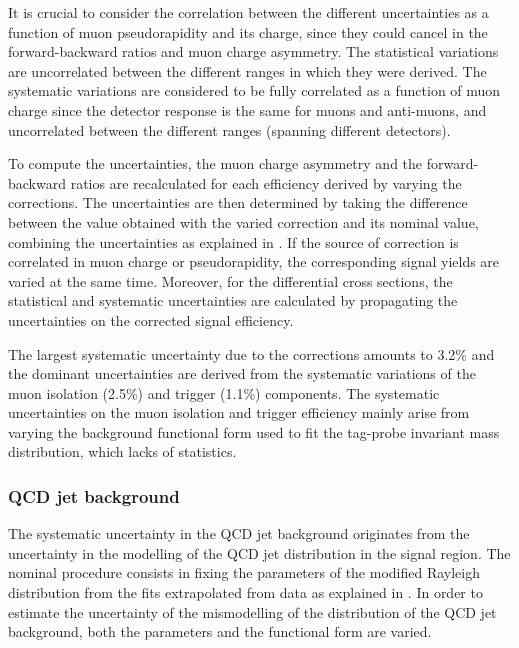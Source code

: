 It is crucial to consider the correlation between the different \tnp uncertainties as a function of muon pseudorapidity and its charge, since they could cancel in the forward-backward ratios and muon charge asymmetry. The statistical \tnp variations are uncorrelated between the different \etaLAB ranges in which they were derived. The systematic \tnp variations are considered to be fully correlated as a function of muon charge since the detector response is the same for muons and anti-muons, and uncorrelated between the different \etaCM ranges (spanning different detectors).

To compute the uncertainties, the muon charge asymmetry and the forward-backward ratios are recalculated for each efficiency derived by varying the \tnp corrections. The \tnp uncertainties are then determined by taking the difference between the value obtained with the varied \tnp correction and its nominal value, combining the uncertainties as explained in . If the source of \tnp correction is correlated in muon charge or pseudorapidity, the corresponding signal yields are varied at the same time. Moreover, for the \Wpm differential cross sections, the statistical and systematic \tnp uncertainties are calculated by propagating the uncertainties on the corrected signal efficiency.

The largest systematic uncertainty due to the \tnp corrections amounts to 3.2\% and the dominant \tnp uncertainties are derived from the \tnp systematic variations of the muon isolation (2.5\%) and trigger (1.1\%) components. The \tnp systematic uncertainties on the muon isolation and trigger efficiency mainly arise from varying the background functional form used to fit the tag-probe invariant mass distribution, which lacks of statistics.

\subsubsection{QCD jet background}

The systematic uncertainty in the QCD jet background originates from the uncertainty in the modelling of the QCD jet \ptmiss distribution in the signal region. The nominal procedure consists in fixing the parameters of the modified Rayleigh distribution from the fits extrapolated from data as explained in . In order to estimate the uncertainty of the mismodelling of the \ptmiss distribution of the QCD jet background, both the parameters and the functional form are varied.

